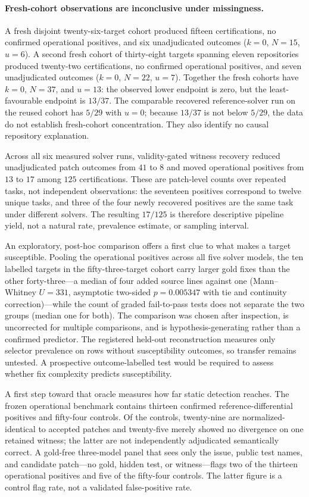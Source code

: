 \documentclass[11pt]{article}
\begin{document}
\paragraph{Fresh-cohort observations are inconclusive under missingness.} A fresh disjoint twenty-six-target
cohort produced fifteen certifications, no confirmed operational positives, and six unadjudicated outcomes
($k=0$, $N=15$, $u=6$). A second fresh cohort of thirty-eight targets spanning eleven repositories produced
twenty-two certifications, no confirmed operational positives, and seven unadjudicated outcomes
($k=0$, $N=22$, $u=7$). Together the fresh cohorts have $k=0$, $N=37$, and $u=13$: the observed lower endpoint
is zero, but the least-favourable endpoint is $13/37$. The comparable recovered reference-solver run on the
reused cohort has $5/29$ with $u=0$; because $13/37$ is not below $5/29$, the data do not establish
fresh-cohort concentration. They also identify no causal repository explanation.

Across all six measured solver runs, validity-gated witness recovery reduced unadjudicated patch outcomes from
$41$ to $8$ and moved operational positives from $13$ to $17$ among $125$ certifications. These are
patch-level counts over repeated tasks, not independent observations: the seventeen positives correspond to
twelve unique tasks, and three of the four newly recovered positives are the same task under different
solvers. The resulting $17/125$ is therefore descriptive pipeline yield, not a natural rate, prevalence
estimate, or sampling interval.

An exploratory, post-hoc comparison offers a first clue to what makes a target susceptible. Pooling the
operational positives across all five solver models, the ten labelled targets in the fifty-three-target cohort carry
larger gold fixes than the other forty-three---a median of four added source lines against one
(Mann--Whitney $U=331$, asymptotic two-sided $p=0.005347$ with tie and continuity correction)---while the
count of graded fail-to-pass tests does not separate the two groups (median one for both). The comparison was
chosen after inspection, is uncorrected for multiple comparisons, and is hypothesis-generating rather than a
confirmed predictor. The registered held-out reconstruction measures only selector prevalence on rows without
susceptibility outcomes, so transfer remains untested. A prospective outcome-labelled test would be required
to assess whether fix complexity predicts susceptibility.

A first step toward that oracle measures how far static detection reaches. The frozen operational benchmark
contains thirteen confirmed reference-differential positives and fifty-four controls. Of the controls,
twenty-nine are normalized-identical to accepted patches and twenty-five merely showed no divergence on one
retained witness; the latter are not independently adjudicated semantically correct. A gold-free three-model
panel that sees only the issue, public test names, and candidate patch---no gold, hidden test, or witness---flags
two of the thirteen operational positives and five of the fifty-four controls. The latter figure is a control
flag rate, not a validated false-positive rate.
\end{document}
